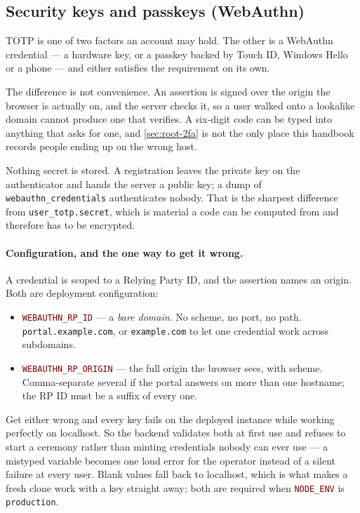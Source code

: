\documentclass[12pt,a4paper,twoside]{report}
\newcommand{\code}[1]{\texttt{#1}}
\newcommand{\env}[1]{\texttt{\textcolor{Maroon}{#1}}}
\begin{document}
\subsection*{Security keys and passkeys (WebAuthn)}

TOTP is one of two factors an account may hold. The other is a WebAuthn
credential --- a hardware key, or a passkey backed by Touch ID, Windows Hello or
a phone --- and either satisfies the requirement on its own.

The difference is not convenience. An assertion is signed over the origin the
browser is actually on, and the server checks it, so a user walked onto a
lookalike domain cannot produce one that verifies. A six-digit code can be typed
into anything that asks for one, and \autoref{sec:root-2fa} is not the only place
this handbook records people ending up on the wrong host.

Nothing secret is stored. A registration leaves the private key on the
authenticator and hands the server a public key; a dump of
\code{webauthn\_credentials} authenticates nobody. That is the sharpest
difference from \code{user\_totp.secret}, which is material a code can be computed
from and therefore has to be encrypted.

\paragraph{Configuration, and the one way to get it wrong.}
A credential is scoped to a Relying Party ID, and the assertion names an origin.
Both are deployment configuration:

\begin{itemize}
  \item \env{WEBAUTHN\_RP\_ID} --- a \emph{bare domain}. No scheme, no port, no
    path. \code{portal.example.com}, or \code{example.com} to let one credential
    work across subdomains.
  \item \env{WEBAUTHN\_RP\_ORIGIN} --- the full origin the browser sees, with
    scheme. Comma-separate several if the portal answers on more than one
    hostname; the RP ID must be a suffix of every one.
\end{itemize}

Get either wrong and every key fails on the deployed instance while working
perfectly on localhost. So the backend validates both at first use and refuses to
start a ceremony rather than minting credentials nobody can ever use --- a
mistyped variable becomes one loud error for the operator instead of a silent
failure at every user. Blank values fall back to localhost, which is what makes a
fresh clone work with a key straight away; both are required when
\env{NODE\_ENV} is \code{production}.
\end{document}
